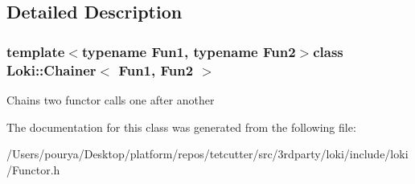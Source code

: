 \subsection{Detailed Description}
\subsubsection*{template$<$typename Fun1, typename Fun2$>$class Loki\+::\+Chainer$<$ Fun1, Fun2 $>$}

Chains two functor calls one after another 

The documentation for this class was generated from the following file\+:\begin{DoxyCompactItemize}
\item 
/\+Users/pourya/\+Desktop/platform/repos/tetcutter/src/3rdparty/loki/include/loki/Functor.\+h\end{DoxyCompactItemize}
